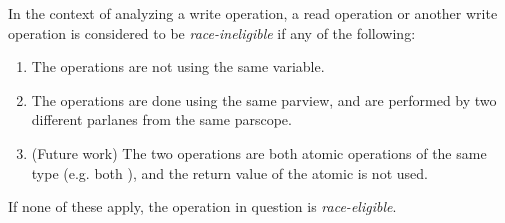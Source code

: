\filbreak
{} In the context of analyzing a write operation, a read operation or another write operation is considered to be \textit{race-ineligible} if any of the following:

\begin{enumerate}
  \item The operations are not using the same variable.
  \item The operations are done using the same parview, and are performed by two different parlanes from the same parscope.
  \item (Future work) The two operations are both atomic operations of the same type (e.g. both ), and the return value of the atomic is not used.
\end{enumerate}

If none of these apply, the operation in question is \textit{race-eligible}.

\filbreak
{}

\filbreak
{}

\filbreak
{}

\filbreak
{}






